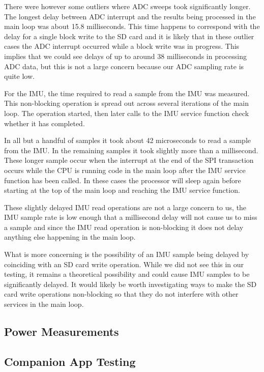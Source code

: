 There were however some outliers where ADC sweeps took significantly longer.
The longest delay between ADC interrupt and the results being processed in the
main loop was about 15.8 milliseconds. This time happens to correspond with the
delay for a single block write to the SD card and it is likely that in these
outlier cases the ADC interrupt occurred while a block write was in progress.
This implies that we could see delays of up to around 38 milliseconds in
processing ADC data, but this is not a large concern because our ADC sampling
rate is quite low.

For the IMU, the time required to read a sample from the IMU was measured. This
non-blocking operation is spread out across several iterations of the main loop.
The operation started, then later calls to the IMU service function check
whether it has completed.

In all but a handful of samples it took about 42 microseconds to read a sample
from the IMU. In the remaining samples it took slightly more than a millisecond.
These longer sample occur when the interrupt at the end of the SPI transaction
occurs while the CPU is running code in the main loop after the IMU service
function has been called. In these cases the processor will sleep again before
starting at the top of the main loop and reaching the IMU service function.

These slightly delayed IMU read operations are not a large concern to us, the
IMU sample rate is low enough that a millisecond delay will not cause us to
miss a sample and since the IMU read operation is non-blocking it does not delay
anything else happening in the main loop.

What is more concerning is the possibility of an IMU sample being delayed by
coinciding with an SD card write operation. While we did not see this in our
testing, it remains a theoretical possibility and could cause IMU samples to be
significantly delayed. It would likely be worth investigating ways to make the
SD card write operations non-blocking so that they do not interfere with other
services in the main loop.

\subsection{Power Measurements}

\subsection{Companion App Testing}





